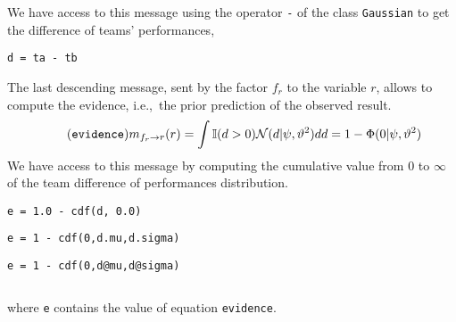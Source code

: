 \documentclass[article]{jss}
\newcommand{\N}{\mathcal{N}}
\begin{document}
We have access to this message using the operator \texttt{-} of the class \texttt{Gaussian} to get the difference of teams' performances,
%
\begin{lstlisting}[captionpos=b,backgroundcolor=\color{all},label=lst:difference_performance, caption={Computing the prior perfomance' difference}, belowskip=0cm]
d = ta - tb 
\end{lstlisting}
%
The last descending message, sent by the factor $f_r$ to the variable $r$, allows to compute the evidence, i.e.,~the prior prediction of the observed result. 
%
\begin{equation*}\label{eq:m_fr_r} \tag{\texttt{evidence}}
\begin{split}
 m_{f_{r} \rightarrow r}(r) = \int \mathbb{I}(d > 0) \N(d | \psi, \vartheta^2)  dd = 1 - \Phi(0|\psi, \vartheta^2)
\end{split}
\end{equation*}
%
We have access to this message by computing the cumulative value from $0$ to $\infty$ of the team difference of performances distribution. 
%
\begin{paracol}{3}
\begin{lstlisting}[backgroundcolor=\color{julia!60}, belowskip=0cm]
e = 1.0 - cdf(d, 0.0)
\end{lstlisting}  
 \switchcolumn
\begin{lstlisting}[backgroundcolor=\color{python!60}, belowskip=0cm]
e = 1 - cdf(0,d.mu,d.sigma) 
\end{lstlisting} 
 \switchcolumn
\begin{lstlisting}[backgroundcolor=\color{r!50}, belowskip=0cm]
e = 1 - cdf(0,d@mu,d@sigma) 
\end{lstlisting}
\end{paracol}
\begin{lstlisting}[captionpos=b,backgroundcolor=\color{white},label=lst:difference, caption={Computing the prior prediction of the observed result (or evidence).}, aboveskip=0cm, belowskip=0cm]
\end{lstlisting}
%
where \texttt{e} contains the value of equation \texttt{evidence}. 
\end{document}
